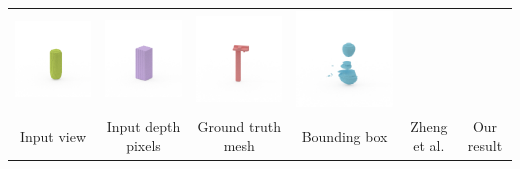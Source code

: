 \documentclass[10pt,onecolumn,letterpaper]{article}
\makeatletter
\newcommand*{\ea}{et al.\@\xspace}
\makeatother
\begin{document}
\begin{tabular}{cccccc}
\includegraphics[height=\turnheight, clip=true, trim=60 30 30 5]{red_bull_NP4_0_gt_view_270.png} &
\includegraphics[height=\turnheight, clip=true, trim=60 30 30 5]{red_bull_NP4_0_bb_view_270.png} &
\includegraphics[height=\turnheight, clip=true, trim=60 30 30 5]{red_bull_NP4_0_zheng_view_270.png} &
\includegraphics[height=\turnheight, clip=true, trim=60 30 30 5]{red_bull_NP4_0_oma_view_270} \\
     Input view & Input depth pixels & Ground truth mesh & Bounding box &  Zheng \ea & Our result \\
\end{tabular}
\label{fig:bb}
\vspace{10pt}
\end{document}
